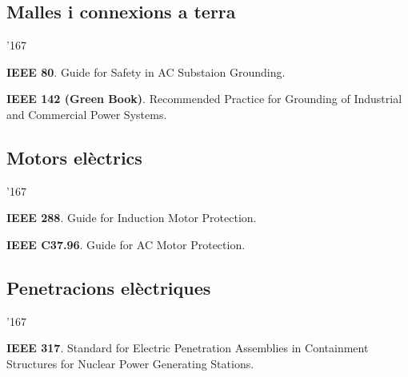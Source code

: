 \subsection*{Malles i connexions a terra}
\begin{dinglist}{'167}
    \item \textbf{IEEE 80}. Guide for Safety in AC Substaion Grounding.
    \item \textbf{IEEE 142 (Green Book)}. Recommended Practice for Grounding of Industrial and Commercial Power Systems.
\end{dinglist}

\subsection*{Motors el\`{e}ctrics}
\begin{dinglist}{'167}
    \item \textbf{IEEE 288}. Guide for Induction Motor Protection.
    \item \textbf{IEEE C37.96}. Guide for AC Motor Protection.
\end{dinglist}


\subsection*{Penetracions el\`{e}ctriques}
\begin{dinglist}{'167}
    \item \textbf{IEEE 317}. Standard for Electric Penetration Assemblies in Containment Structures for Nuclear Power Generating Stations.
\end{dinglist}


